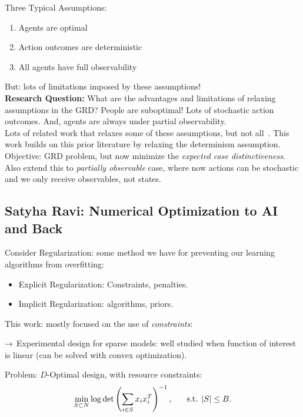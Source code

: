 Three Typical Assumptions:
\begin{enumerate}
    \item Agents are optimal
    \item Action outcomes are deterministic
    \item All agents have full observability
\end{enumerate}

But: lots of limitations imposed by these assumptions! \\

{\bf Research Question:} What are the advantages and limitations of relaxing assumptions in the GRD? People are suboptimal! Lots of stochastic action outcomes. And, agents are always under partial observability. \\

Lots of related work that relaxes some of these assumptions, but not all~\cite{keren2015goal}. This work builds on this prior literature by relaxing the determinism assumption. \\

Objective: GRD problem, but now minimize the {\it expected case distinctiveness}. Also extend this to {\it partially observable} case, where now actions can be stochastic and we only receive observables, not states.

\spacerule
\subsection{Satyha Ravi: Numerical Optimization to AI and Back}

Consider Regularization: some method we have for preventing our learning algorithms from overfitting:
\begin{itemize}
    \item Explicit Regularization: Constraints, penalties.
    \item Implicit Regularization: algorithms, priors.
\end{itemize}

This work: mostly focused on the use of {\it constraints}:

$\rightarrow$ Experimental design for sparse models: well studied when function of interest is linear (can be solved with convex optimization).

Problem: $D$-Optimal design, with resource constraints:
\[
\min_{S \subset N} \log \det \left(\sum_{i \in S} x_i x_i^T\right)^{-1}, \hspace{6mm} \text{s.t. } |S| \leq B.
\]

